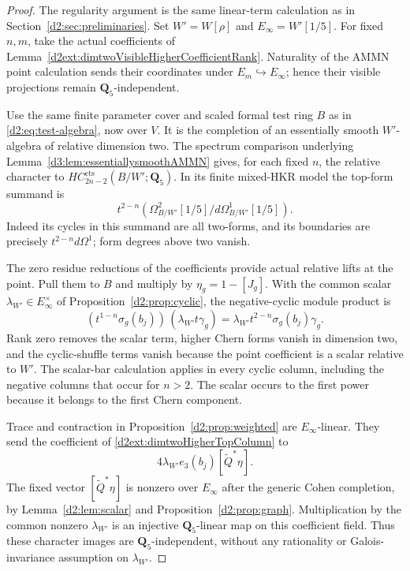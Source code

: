 \documentclass[11pt,a4paper]{amsart}
\numberwithin{equation}{section}
\theoremstyle{definition}
\theoremstyle{remark}
\begin{document}
\begin{proof}
The regularity argument is the same linear-term calculation as in
Section~\ref{d2:sec:preliminaries}.
Set $W'=W[\rho]$ and $E_\infty=W'[1/5]$.
For fixed $n,m$, take the actual coefficients of
Lemma~\ref{d2ext:dimtwoVisibleHigherCoefficientRank}.
Naturality of the AMMN point calculation sends their coordinates
under $E_m\hookrightarrow E_\infty$; hence their visible
projections remain $\mathbf Q_5$-independent.

Use the same finite parameter cover and scaled formal test ring
$B$ as in \eqref{d2:eq:test-algebra}, now over $V$.
It is the completion of an essentially smooth $W'$-algebra
of relative dimension two.  The spectrum comparison underlying
Lemma~\ref{d3:lem:essentiallysmoothAMMN} gives, for each fixed $n$,
the relative character to $HC_{2n-2}^{\mathrm{cts}}(B/W';\mathbf Q_5)$.
In its finite mixed-HKR model the top-form summand is
\begin{equation}
\label{d2ext:dimtwoHigherTopColumn}
 t^{2-n}\left(
 \Omega^2_{B/W'}[1/5]/d\Omega^1_{B/W'}[1/5]\right).
\end{equation}
Indeed its cycles in this summand are all two-forms, and its
boundaries are precisely $t^{2-n}d\Omega^1$; form degrees above
two vanish.

The zero residue reductions of the coefficients provide actual
relative lifts at the point. Pull them to $B$ and multiply by
$\eta_g=1-[J_g]$.
With the common scalar $\lambda_{W'}\in E_\infty^\times$ of
Proposition~\ref{d2:prop:cyclic}, the negative-cyclic module product is
\[
 (t^{1-n}\sigma_g(b_j))\,(\lambda_{W'}t\gamma_g)
       =\lambda_{W'}t^{2-n}\sigma_g(b_j)\gamma_g.
\]
Rank zero removes the scalar term, higher Chern forms vanish in
dimension two, and the cyclic-shuffle terms vanish because the
point coefficient is a scalar relative to $W'$.
The scalar-bar calculation applies in every cyclic column, including
the negative columns that occur for $n>2$.
The scalar occurs to the first power because it belongs to the
first Chern component.

Trace and contraction in Proposition~\ref{d2:prop:weighted} are
$E_\infty$-linear. They send the coefficient of
\eqref{d2ext:dimtwoHigherTopColumn} to
\[
 4\lambda_{W'}e_3(b_j)[\widetilde Q^*\eta].
\]
The fixed vector $[\widetilde Q^*\eta]$ is nonzero over $E_\infty$
after the generic Cohen completion, by
Lemma~\ref{d2:lem:scalar} and Proposition~\ref{d2:prop:graph}.
Multiplication by the common nonzero $\lambda_{W'}$ is an
injective $\mathbf Q_5$-linear map on this coefficient field.
Thus these character images are $\mathbf Q_5$-independent,
without any rationality or Galois-invariance assumption on
$\lambda_{W'}$.


\end{proof}
\end{document}
